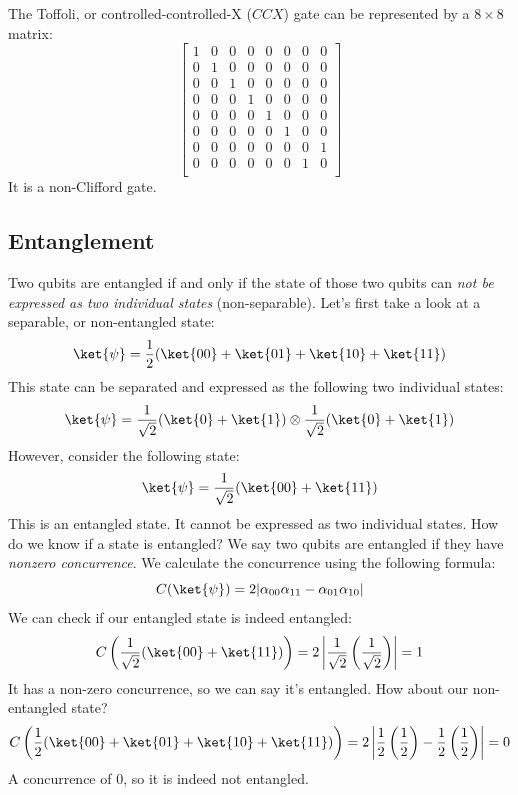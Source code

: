 \documentclass[11pt]{article}
\begin{document}
\newpage
\noindent
The Toffoli, or controlled-controlled-X ($CCX$) gate can be represented by a $8 \times 8$ matrix:
\[
  \begin{bmatrix}
  1 & 0 & 0 & 0 & 0 & 0 & 0 & 0\\
  0 & 1 & 0 & 0 & 0 & 0 & 0 & 0\\
  0 & 0 & 1 & 0 & 0 & 0 & 0 & 0\\
  0 & 0 & 0 & 1 & 0 & 0 & 0 & 0\\
  0 & 0 & 0 & 0 & 1 & 0 & 0 & 0\\
  0 & 0 & 0 & 0 & 0 & 1 & 0 & 0\\
  0 & 0 & 0 & 0 & 0 & 0 & 0 & 1\\
  0 & 0 & 0 & 0 & 0 & 0 & 1 & 0\\
  \end{bmatrix}
\]
It is a non-Clifford gate.

\subsection{Entanglement}
Two qubits are entangled if and only if the state of those two qubits can \emph{not be expressed as two individual states} (non-separable). Let's first take a look at a separable, or non-entangled state:
\[
  \ket{\psi} = \dfrac{1}{2}(\ket{00} + \ket{01} + \ket{10} + \ket{11})
\]
This state can be separated and expressed as the following two individual states:
\[
  \ket{\psi} = \dfrac{1}{\sqrt2}(\ket{0} + \ket{1}) \otimes \dfrac{1}{\sqrt2}(\ket{0} + \ket{1})
\]
However, consider the following state:
\[
  \ket{\psi} = \dfrac{1}{\sqrt2}(\ket{00} + \ket{11})
\]
This is an entangled state. It cannot be expressed as two individual states. How do we know if a state is entangled? We say two qubits are entangled if they have \emph{nonzero concurrence}. We calculate the concurrence using the following formula:
\[
  C(\ket{\psi}) = 2|\alpha_{00}\alpha_{11} - \alpha_{01}\alpha_{10}|
\]
We can check if our entangled state is indeed entangled:
\[
  C\left(\dfrac{1}{\sqrt2}(\ket{00} + \ket{11})\right) = 2\left|\dfrac{1}{\sqrt2}\left(\dfrac{1}{\sqrt2}\right)\right| = 1
\]
It has a non-zero concurrence, so we can say it's entangled. How about our non-entangled state?
\[
  C\left(\dfrac{1}{2}(\ket{00} + \ket{01} + \ket{10} + \ket{11})\right) = 2\left|\dfrac{1}{2}\left(\dfrac{1}{2}\right) - \dfrac{1}{2}\left(\dfrac{1}{2}\right)\right| = 0
\]
A concurrence of 0, so it is indeed not entangled.
\end{document}

